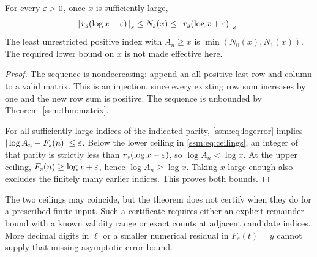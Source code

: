 \begin{proposition}\label{ssm:prop:threshold}
For every $\varepsilon>0$, once $x$ is sufficiently large,
\begin{equation}\label{ssm:eq:ceilings}
 \left\lceil r_s(\log x-\varepsilon)\right\rceil_s
 \le N_s(x)\le
 \left\lceil r_s(\log x+\varepsilon)\right\rceil_s.
\end{equation}
The least unrestricted positive index with $A_n\ge x$ is $\min(N_0(x),N_1(x))$. The required lower bound on $x$ is not made effective here.
\end{proposition}
\begin{proof}
The sequence is nondecreasing: append an all-positive last row and column to a valid matrix. This is an injection, since every existing row sum increases by one and the new row sum is positive. The sequence is unbounded by Theorem~\ref{ssm:thm:matrix}.

For all sufficiently large indices of the indicated parity, \eqref{ssm:eq:logerror} implies $|\log A_n-F_s(n)|\le\varepsilon$. Below the lower ceiling in \eqref{ssm:eq:ceilings}, an integer of that parity is strictly less than $r_s(\log x-\varepsilon)$, so $\log A_n<\log x$. At the upper ceiling, $F_s(n)\ge\log x+\varepsilon$, hence $\log A_n\ge\log x$. Taking $x$ large enough also excludes the finitely many earlier indices. This proves both bounds.
\end{proof}

The two ceilings may coincide, but the theorem does not certify when they do for a prescribed finite input. Such a certificate requires either an explicit remainder bound with a known validity range or exact counts at adjacent candidate indices. More decimal digits in $\ell$ or a smaller numerical residual in $F_s(t)=y$ cannot supply that missing asymptotic error bound.

